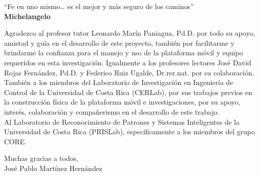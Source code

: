

\begin{reconocimiento}{``Fe en uno mismo… es el mejor y más seguro de los caminos''\\
\textbf{ Michelangelo}\\}

Agradezco al profesor tutor Leonardo Marín Paniagua, Pd.D. por todo su apoyo, amistad y guía en el desarrollo de este proyecto, también por facilitarme y brindarme la confianza para el manejo y uso de la plataforma móvil y equipo requeridos en esta investigación. Igualmente a los profesores lectores José David Rojas Fernández, Pd.D. y Federico Ruiz Ugalde, Dr.rer.nat. por su colaboración.\\

También a los miembros del Laboratorio de Investigación en Ingeniería de Control de la Universidad de Costa Rica (CERLab), por sus trabajos previos en la construcción física de la plataforma móvil e investigaciones, por su apoyo, interés, colaboración y compañerismo en el desarrollo de este trabajo.\\

Al Laboratorio de Reconocimiento de Patrones y Sistemas Inteligentes de la Universidad de Costa Rica (PRISLab), específicamente a los miembros del grupo CORE.

\begin{flushright}
Muchas gracias a todos, \\
José Pablo Martínez Hernández
\end{flushright}
\end{reconocimiento}